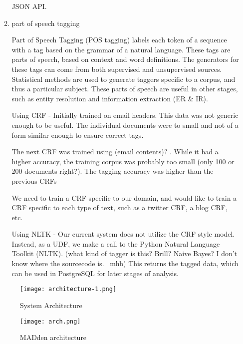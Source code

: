 \documentclass{article}
\newcommand{\system}{MADden\xspace}
\begin{document}
\begin{enumerate}
\begin{enumerate}
    JSON API.


  \item part of speech tagging

    Part of Speech Tagging (POS tagging) labels each token of a sequence with a tag based on the grammar of a natural language.
    These tags are parts of speech, based on context and word definitions.
    The generators for these tags can come from both supervised and unsupervised sources.
    Statistical methods are used to generate taggers specific to a corpus, and thus a particular subject.
    These parts of speech are useful in other stages, such as entity resolution and information extraction (ER \& IR).

    Using CRF -
    Initially trained on email headers.
    This data was not generic enough to be useful.
    The individual documents were to small and not of a form similar enough to ensure correct tags.

    The next CRF was trained using (email contents)? .
    While it had a higher accuracy, the training corpus was probably too small (only 100 or 200 documents right?).
    The tagging accuracy was higher than the previous CRFs

    We need to train a CRF specific to our domain,
    and would like to train a CRF specific to each type of text,
    such as a twitter CRF, a blog CRF, etc.

    Using NLTK -
    Our current system does not utilize the CRF style model.
    Instead, as a UDF, we make a call to the Python Natural Language Toolkit (NLTK).
    (what kind of tagger is this? Brill? Naive Bayes? I don't know where the sourcecode is. ~mhb)
    This returns the tagged data, which can be used in PostgreSQL for later stages of analysis.


  \end{enumerate}





  \begin{figure}
    \begin{center}
      \texttt{[image: architecture-1.png]}
      \caption{System Architecture}
      \label{fig:architecture}
    \end{center}
  \end{figure}

  \begin{figure}
    \begin{center}
      \texttt{[image: arch.png]}
      \caption{{\system} architecture}
      \label{fig:arch}
    \end{center}
  \end{figure}


\end{enumerate}
\end{document}
